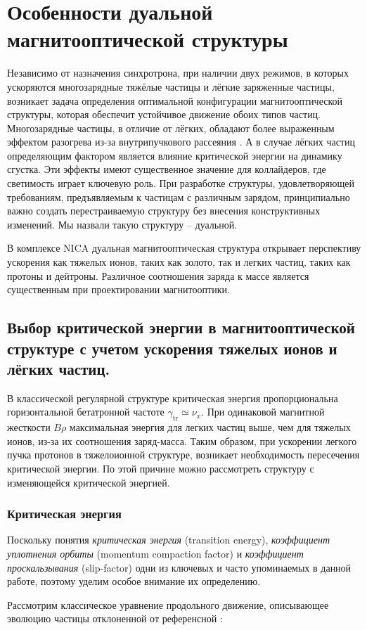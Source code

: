 
	\chapter{Особенности дуальной магнитооптической структуры}\label{ch:dual}

\par Независимо от назначения синхротрона, при наличии двух режимов, в которых ускоряются многозарядные тяжёлые частицы и лёгкие заряженные частицы, возникает задача определения оптимальной конфигурации магнитооптической структуры, которая обеспечит устойчивое движение обоих типов частиц. Многозарядные частицы, в отличие от лёгких, обладают более выраженным эффектом разогрева из-за внутрипучкового рассеяния \cite{trubnikov:cool}. А в случае лёгких частиц определяющим фактором является влияние критической энергии на динамику сгустка. Эти эффекты имеют существенное значение для коллайдеров, где светимость играет ключевую роль. При разработке структуры, удовлетворяющей требованиям, предъявляемым к частицам с различным зарядом, принципиально важно создать перестраиваемую структуру без внесения конструктивных изменений. Мы назвали такую структуру -- дуальной.

\par В комплексе NICA дуальная магнитооптическая структура открывает перспективу ускорения как тяжелых ионов, таких как золото, так и легких частиц, таких как протоны и дейтроны. Различное соотношения заряда к массе является существенным при проектировании магнитооптики.

	\section{Выбор критической энергии в магнитооптической структуре с учетом ускорения тяжелых ионов и лёгких частиц.}\label{sec:ch:ions_light/transition}

\par В классической регулярной структуре критическая энергия пропорциональна горизонтальной бетатронной частоте $\gamma_{\text{tr}}\simeq\nu_{x}$. При одинаковой магнитной жесткости $B\rho$ максимальная энергия для легких частиц выше, чем для тяжелых ионов, из-за их соотношения заряд-масса. Таким образом, при ускорении легкого пучка протонов в тяжелоионной структуре, возникает необходимость пересечения критической энергии. По этой причине можно рассмотреть структуру с изменяющейся критической энергией.

\subsection{Критическая энергия}\label{sec:ch:ions_light/transition/energy}
\par Поскольку понятия \textit{критическая энергия} (transition energy), \textit{коэффициент уплотнения орбиты} (momentum compaction factor) и \textit{коэффициент проскальзывания} (slip-factor) одни из ключевых и часто упоминаемых в данной работе, поэтому уделим особое внимание их определению.
\par Рассмотрим классическое уравнение продольного движение, описывающее эволюцию частицы отклоненной от референсной \cite{lee}:

